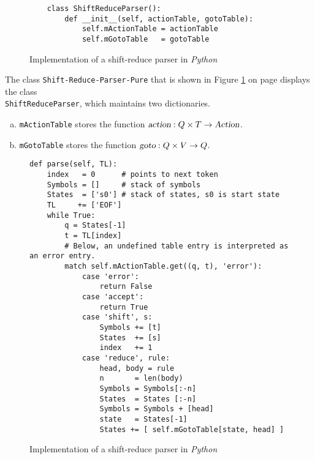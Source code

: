 \begin{figure}[!ht]
\centering
\begin{verbatim}
    class ShiftReduceParser():
        def __init__(self, actionTable, gotoTable):
            self.mActionTable = actionTable
            self.mGotoTable   = gotoTable
\end{verbatim}
\vspace*{-0.3cm}
\caption{Implementation of a shift-reduce parser in \textsl{Python}}
\label{fig:Shift-Reduce-Parser-Pure.ipynb}
\end{figure}

The class \texttt{Shift-Reduce-Parser-Pure} that is shown in Figure \ref{fig:Shift-Reduce-Parser-Pure.ipynb}
on page \pageref{fig:Shift-Reduce-Parser-Pure.ipynb} displays the class \\
\texttt{ShiftReduceParser}, which
maintains two dictionaries.
\begin{enumerate}[(a)]
\item \texttt{mActionTable} stores the function $\textsl{action}: Q \times T \rightarrow \textsl{Action}$.
\item \texttt{mGotoTable} stores the function $\textsl{goto}: Q \times V \rightarrow Q$.
\end{enumerate}

\begin{figure}[!ht]
\centering
\begin{verbatim}      
def parse(self, TL):
    index   = 0      # points to next token
    Symbols = []     # stack of symbols
    States  = ['s0'] # stack of states, s0 is start state
    TL     += ['EOF']
    while True:
        q = States[-1]
        t = TL[index]
        # Below, an undefined table entry is interpreted as an error entry.
        match self.mActionTable.get((q, t), 'error'):
            case 'error': 
                return False
            case 'accept':
                return True
            case 'shift', s: 
                Symbols += [t]
                States  += [s]
                index   += 1
            case 'reduce', rule:
                head, body = rule
                n       = len(body)
                Symbols = Symbols[:-n]
                States  = States [:-n] 
                Symbols = Symbols + [head]
                state   = States[-1]
                States += [ self.mGotoTable[state, head] ]
\end{verbatim}
\vspace*{-0.3cm}
\caption{Implementation of a shift-reduce parser in \textsl{Python}}
\label{fig:Shift-Reduce-Parser-Pure.ipynb:parse}
\end{figure}


